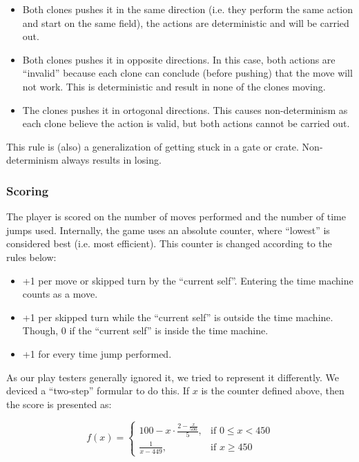 \begin{itemize}
\item Both clones pushes it in the same direction (i.e. they perform
  the same action and start on the same field), the actions are
  deterministic and will be carried out.
\item Both clones pushes it in opposite directions.  In this case,
  both actions are ``invalid'' because each clone can conclude (before
  pushing) that the move will not work.  This is deterministic and
  result in none of the clones moving.
\item The clones pushes it in ortogonal directions.  This causes
  non-determinism as each clone believe the action is valid, but
  both actions cannot be carried out.
\end{itemize}

This rule is (also) a generalization of getting stuck in a gate or
crate. Non-determinism always results in losing.

\subsubsection{Scoring}
The player is scored on the number of moves performed and the number
of time jumps used.  Internally, the game uses an absolute counter,
where ``lowest'' is considered best (i.e. most efficient).
This counter is changed according to the rules below:

\begin{itemize}
\item +1 per move or skipped turn by the ``current self''.
  Entering the time machine counts as a move.
\item +1 per skipped turn while the ``current self'' is outside
  the time machine.  Though, 0 if the ``current self'' is inside the
  time machine.
\item +1 for every time jump performed.
\end{itemize}

As our play testers generally ignored it, we tried to represent it
differently.  We deviced a ``two-step'' formular to do this.  If $x$
is the counter defined above, then the score is presented as:

\[
f(x) =
\begin{cases}
100 - x \cdot \frac{2 - \frac{x}{500}}{5}, & \mbox{if } 0 \leq x < 450\\
\frac{1}{x - 449}, & \mbox{if } x \geq 450
\end{cases}
\]

